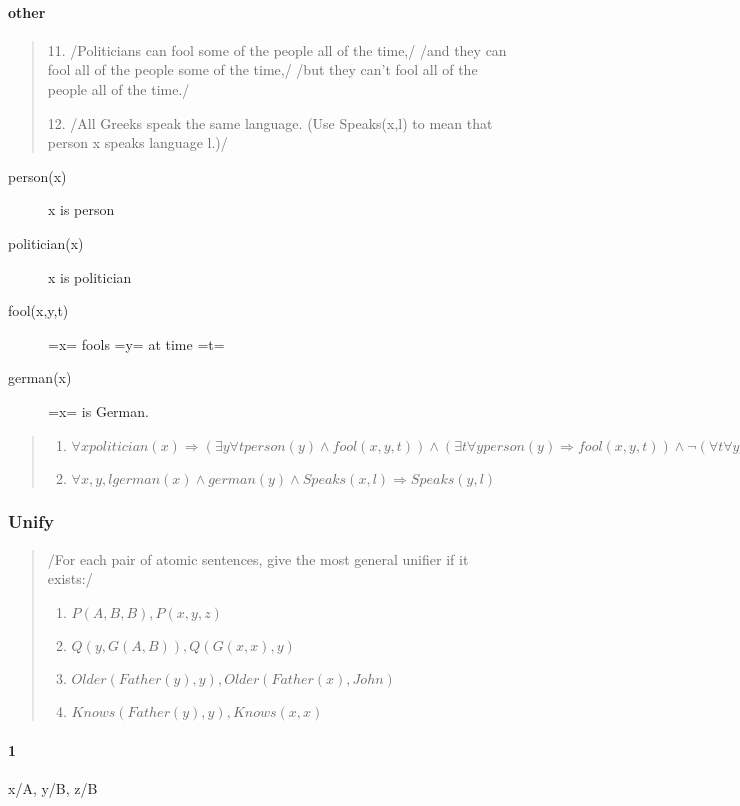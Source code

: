 \paragraph{other}
\begin{quote}
    11. /Politicians can fool some of the people all of the time,/
        /and they can fool all of the people some of the time,/
        /but they can’t fool all of the people all of the time./

    12. /All Greeks speak the same language. (Use Speaks(x,l) to mean that person x speaks language l.)/
\end{quote}
\begin{description}
\item [person(x)] x is person
\item [politician(x)] x is politician
\item [fool(x,y,t)] =x= fools =y= at time =t=
\item [german(x)] =x= is German.
\end{description}
\begin{quote}
  \begin{enumerate}
  \item
    $\forall x politician(x) \Rightarrow (\exists y \forall t
    person(y) \wedge fool(x,y,t)) \wedge (\exists t \forall y
    person(y) \Rightarrow fool(x,y,t)) \wedge \neg (\forall t \forall
    y person(y) \Rightarrow fool(x,y,t))$
  \item
    $\forall x,y,l german(x) \wedge german(y) \wedge Speaks(x,l)
    \Rightarrow Speaks(y,l)$
  \end{enumerate}
\end{quote}

\subsubsection{ Unify}
\begin{quote}
  /For each pair of atomic sentences, give the most general unifier if it exists:/
  \begin{enumerate}
  \item $P(A,B,B), P(x,y,z)$
  \item $Q(y,G(A,B)),Q(G(x,x),y)$
  \item $Older(Father(y),y),Older(Father(x),John)$
  \item $Knows(Father(y),y), Knows(x,x)$
  \end{enumerate}
\end{quote}

\paragraph{1} {x/A, y/B, z/B}

